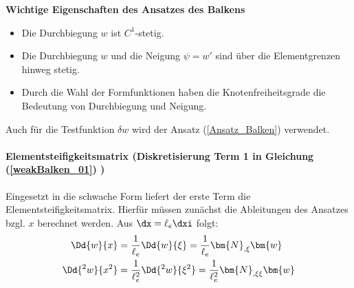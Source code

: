 %  
% 
% 
% 
% 
% 
% 

\begin{framed}
\textbf{Wichtige Eigenschaften des Ansatzes des Balkens}\\
\begin{itemize}
\item Die Durchbiegung $w$ ist $C^1$-stetig.
\item Die Durchbiegung $w$ und die Neigung $\psi=w'$ sind über die Elementgrenzen hinweg stetig.
\item Durch die Wahl der Formfunktionen haben die Knotenfreiheitsgrade die Bedeutung von Durchbiegung und Neigung.
\end{itemize}
\end{framed}

Auch für die Testfunktion $\delta w$ wird der Ansatz (\ref{Ansatz_Balken}) verwendet.


\paragraph{Elementsteifigkeitsmatrix (Diskretisierung Term 1 in Gleichung (\ref{weakBalken_01}) )}

Eingesetzt in die schwache Form liefert der erste Term die Elementsteifigkeitsmatrix. Hierfür müssen zunächst die Ableitungen des Ansatzes bzgl. $x$ berechnet werden. Aus
$\dx = \ell_e \dxi$ folgt:
\begin{align}
  \Dd{w}{x} & = \frac{1}{\ell_e} \Dd{w}{\xi} = \frac{1}{\ell_e} \bm{N}_{,\xi} \bm{w} \\
  \Dd{^2 w}{x^2} & = \frac{1}{\ell_e^2} \Dd{^2 w}{\xi^2} = \frac{1}{\ell_e^2} \bm{N}_{,\xi\xi} \bm{w}
\end{align}


